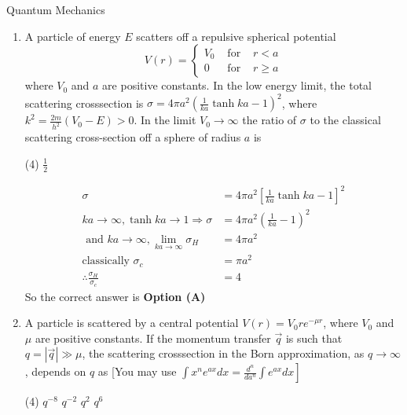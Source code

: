 \begin{abox}
	Quantum Mechanics
	\end{abox}
\begin{enumerate}
	\item A particle of energy $E$ scatters off a repulsive spherical potential
	$$
	V(r)=\left\{\begin{array}{ccc}
	V_{0} & \text { for } & r<a \\
	0 & \text { for } & r \geq a
	\end{array}\right.
	$$
	where $V_{0}$ and $a$ are positive constants. In the low energy limit, the total scattering crosssection is $\sigma=4 \pi a^{2}\left(\frac{1}{k a} \tanh k a-1\right)^{2}$, where $k^{2}=\frac{2 m}{h^{2}}\left(V_{0}-E\right)>0$. In the limit $V_{0} \rightarrow \infty$ the ratio of $\sigma$ to the classical scattering cross-section off a sphere of radius $a$ is
{	}
\begin{tasks}(4)
\task[\textbf{D.}] $\frac{1}{2}$
\end{tasks}
\begin{answer}
	$$
\begin{aligned}
\sigma&=4 \pi a^{2}\left[\frac{1}{k a} \tanh k a-1\right]^{2}\\
k a \rightarrow \infty, \tanh k a \rightarrow 1 \Rightarrow \sigma&=4 \pi a^{2}\left(\frac{1}{k a}-1\right)^{2}\\
\text{	and }k a \rightarrow \infty, \lim _{k a \rightarrow \infty} \sigma_{H}&=4 \pi a^{2}\\
\text{classically }\sigma_{c}&=\pi a^{2}\\
\therefore \frac{\sigma_{H}}{\sigma_{c}}&=4
\end{aligned}
$$
So the correct answer is \textbf{Option (A)}
\end{answer}
\item 	A particle is scattered by a central potential $V(r)=V_{0} r e^{-\mu r}$, where $V_{0}$ and $\mu$ are positive constants. If the momentum transfer $\vec{q}$ is such that $q=|\vec{q}| \gg \mu$, the scattering crosssection in the Born approximation, as $q \rightarrow \infty$, depends on $q$ as
[You may use $\left.\int x^{n} e^{a x} d x=\frac{d^{n}}{d a^{n}} \int e^{a x} d x\right]$
{{}}
\begin{tasks}(4)
\task[\textbf{A.}] $q^{-8}$
\task[\textbf{B.}] $q^{-2}$
\task[\textbf{C.}] $q^{2}$
\task[\textbf{D.}] $q^{6}$
\end{tasks}

\end{enumerate}
